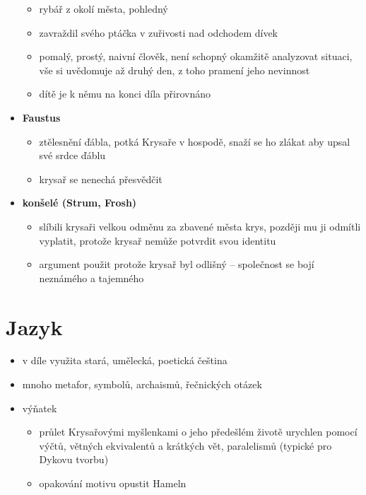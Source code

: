 \documentclass[10pt,a4paper]{article}
\begin{document}
\begin{itemize}
\begin{itemize}
	\item rybář z okolí města, pohledný
	\item zavraždil svého ptáčka v zuřivosti nad odchodem dívek
	\item pomalý, prostý, naivní člověk, není schopný okamžitě analyzovat situaci, vše si uvědomuje až druhý den, z toho pramení jeho nevinnost
	\item dítě je k němu na konci díla přirovnáno
	\end{itemize}
\item \textbf{Faustus}
	\begin{itemize}
	\item ztělesnění ďábla, potká Krysaře v hospodě, snaží se ho zlákat aby upsal své srdce ďáblu
	\item krysař se nenechá přesvědčit
	\end{itemize}
\item \textbf{konšelé (Strum, Frosh)}
	\begin{itemize}
	\item slíbili krysaři velkou odměnu za zbavené města krys, později mu ji odmítli vyplatit, protože krysař nemůže potvrdit svou identitu
	\item argument použit protože krysař byl odlišný -- společnost se bojí neznámého a tajemného
	\end{itemize}
\end{itemize}
\section*{Jazyk}
\begin{itemize}
\item v díle využita stará, umělecká, poetická čeština
\item mnoho metafor, symbolů, archaismů, řečnických otázek
\item výňatek
	\begin{itemize}
	\item průlet Krysařovými myšlenkami o jeho předešlém životě urychlen pomocí výčtů, větných ekvivalentů a krátkých vět, paralelismů (typické pro Dykovu tvorbu)
	\item opakování motivu opustit Hameln
	\end{itemize}
\end{itemize}
\end{document}
